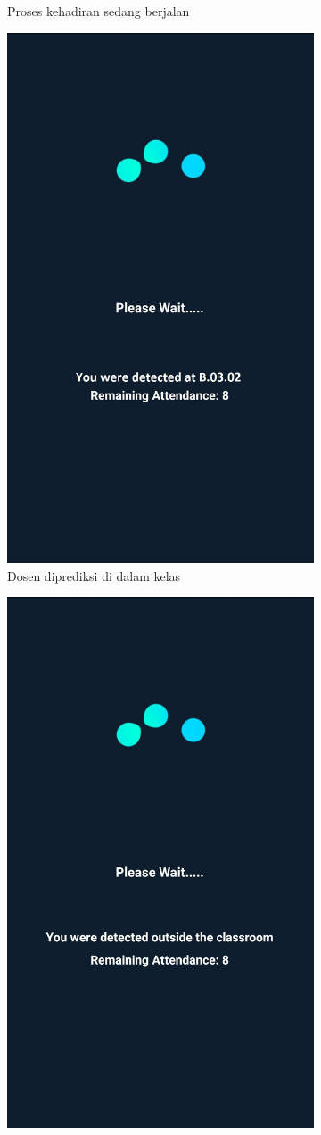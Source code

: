 \begin{enumerate}[a.]
\begin{enumerate}[a.]
\begin{figure} [H]
\begin{subfigure}{.5\textwidth}
			      \caption{Proses kehadiran sedang berjalan}
		      \end{subfigure}
		      \vspace{1cm}
		      \newline
		      \begin{subfigure}{.5\textwidth}
			      \centering
			      \includegraphics[width=.5\linewidth]{gambar/android/dosen-7}
			      \caption{Dosen diprediksi di dalam kelas}
		      \end{subfigure}
		      \begin{subfigure}{.5\textwidth}
			      \centering
			      \includegraphics[width=.5\linewidth]{gambar/android/dosen-8}

\end{subfigure}
\end{figure}
\end{enumerate}
\end{enumerate}
